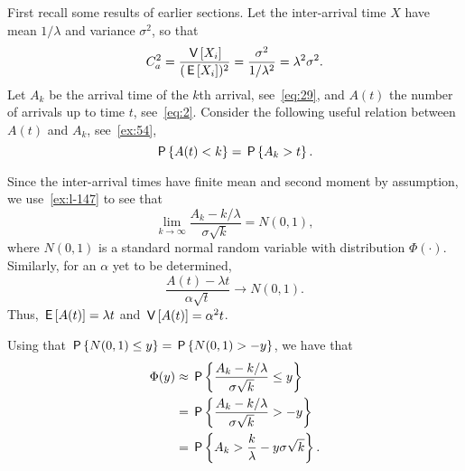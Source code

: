 First recall some results of earlier sections.
Let the inter-arrival time $X$ have mean $1/\lambda$ and variance $\sigma^2$, so that
\begin{equation*}
C_a^2 = \frac{\V{X_i}}{(\E{X_i})^2} = \frac{\sigma^2}{1/\lambda^2} = \lambda^2 \sigma^2.
\end{equation*}
Let $A_k$ be the arrival time of the $k$th arrival, see~\cref{eq:29}, and $A(t)$ the number of arrivals up to time $t$, see~\cref{eq:2}.
Consider the following useful relation between $A(t)$ and $A_k$, see~\cref{ex:54},
\begin{equation*}
\P{A(t) < k} = \P{A_k > t}.
\end{equation*}



Since the inter-arrival times have finite mean and second moment by assumption, we use~\cref{ex:l-147} to see that
\begin{equation*}
\lim_{k\to\infty}\frac{A_k -k/\lambda}{\sigma \sqrt k} = N(0,1),
\end{equation*}
where $N(0,1)$ is a standard normal random variable with
distribution $\Phi(\cdot)$. Similarly,
for an $\alpha$  yet to be determined,
\begin{equation*}
\frac{A(t) -\lambda t}{\alpha \sqrt t} \to N(0,1).
\end{equation*}
Thus,
$\E{A(t)} = \lambda t$ and $\V{A(t)}=\alpha^2 t$.

Using that $\P{N(0,1) \leq y} = \P{N(0,1) > -y}$, we have that
\begin{align*}
\Phi(y) &\approx \P{\frac{A_k - k/\lambda}{\sigma \sqrt k }\leq y} \\
 &= \P{\frac{A_k - k/\lambda}{\sigma \sqrt k} > -y} \\
 &= \P{A_k > \frac k\lambda - y \sigma \sqrt k}.
\end{align*}


